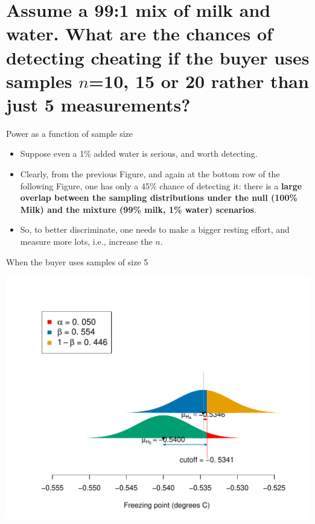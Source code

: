 \documentclass[10pt]{beamer}\usepackage[]{graphicx}\usepackage[]{color}
\makeatletter
\def\maxwidth{ %
  \ifdim\Gin@nat@width>\linewidth
    \linewidth
  \else
    \Gin@nat@width
  \fi
}
\newenvironment{knitrout}{}{} %
\makeatother
\begin{document}
\section{Assume a 99:1 mix of milk and water. What are the chances of detecting cheating if the buyer uses samples $n$=10, 15 or 20 rather than just 5 measurements?}

\begin{frame}{Power as a function of sample size}
	
	\begin{itemize}
		\setlength\itemsep{1em}
		\item Suppose even a 1\% added water is serious, and worth detecting.
		\item Clearly, from the previous Figure, and again at the bottom row of the following Figure,
		one has only a 45\% chance of detecting it: there is a \textbf{large overlap between the sampling distributions under the null (100\% Milk) and the mixture (99\% milk, 1\% water) scenarios}. \pause 
		
		\item So, to better discriminate, one needs to make a bigger resting effort, and measure more lots,
		i.e., increase the $n$.
	\end{itemize}
\end{frame}


\begin{frame}[fragile]{When the buyer uses samples of size 5}

	
	
\begin{knitrout}\tiny
{}\color{fgcolor}

{\centering \includegraphics[width=\maxwidth]{figure/unnamed-chunk-11-1} 

}



\end{knitrout}
\end{frame}
\end{document}
